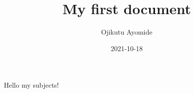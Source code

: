 \documentclass{article}
\title{My first document}
\date{2021-10-18}
\author{Ojikutu Ayomide}
\begin{document}
	\maketitle
	\newpage
	Hello my subjects!
\end{document}
